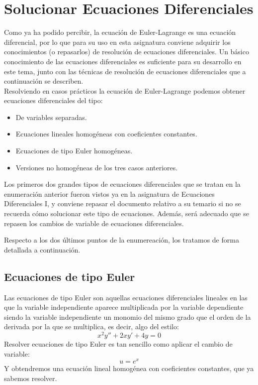 \section{Solucionar Ecuaciones Diferenciales}
\noindent
Como ya ha podido percibir, la ecuación de Euler-Lagrange es una ecuación diferencial, por lo que para su uso en esta asignatura conviene adquirir los conocimientos (o repasarlos) de resolución de ecuaciones diferenciales. Un básico conocimiento de las ecuaciones diferenciales es suficiente para su desarrollo en este tema, junto con las técnicas de resolución de ecuaciones diferenciales que a continuación se describen.\\

\noindent
Resolviendo en casos prácticos la ecuación de Euler-Lagrange podemos obtener ecuaciones diferenciales del tipo:

\begin{itemize}
    \item De variables separadas.
    \item Ecuaciones lineales homogéneas con coeficientes constantes.
    \item Ecuaciones de tipo Euler homogéneas.
    \item Versiones no homogéneas de los tres casos anteriores.
\end{itemize}
Los primeros dos grandes tipos de ecuaciones diferenciales que se tratan en la enumeración anterior fueron vistos ya en la asignatura de Ecuaciones Diferenciales I, y conviene repasar el documento relativo a su temario si no se recuerda cómo solucionar este tipo de ecuaciones. Además, será adecuado que se repasen los cambios de variable de ecuaciones diferenciales.

Respecto a los dos últimos puntos de la enumereación, los tratamos de forma detallada a continuación.

\subsection{Ecuaciones de tipo Euler}
\noindent
Las ecuaciones de tipo Euler son aquellas ecuaciones diferenciales lineales en las que la variable independiente aparece multiplicada por la variable dependiente siendo la variable independiente un monomio del mismo grado que el orden de la derivada por la que se multiplica, es decir, algo del estilo:
\begin{equation*}
    x^2 y'' + 2x y' + 4y = 0
\end{equation*}
Resolver ecuaciones de tipo Euler es tan sencillo como aplicar el cambio de variable:
\begin{equation*}
    u = e^x
\end{equation*}
Y obtendremos una ecuación lineal homogénea con coeficientes constantes, que ya sabemos resolver.

